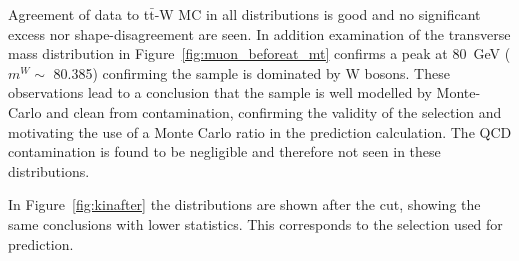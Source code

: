 Agreement of data to t$\bar{\textrm{t}}$-W MC in all distributions is good and no significant excess nor shape-disagreement are seen. In addition examination of the transverse mass distribution in Figure~\ref{fig:muon_beforeat_mt} confirms a peak at 80~GeV ($m^{W} \sim$ 80.385) confirming the sample is dominated by W bosons. These observations lead to a conclusion that the sample is well modelled by Monte-Carlo and clean from contamination, confirming the validity of the selection and motivating the use of a Monte Carlo ratio in the prediction calculation. The QCD contamination is found to be negligible and therefore not seen in these distributions. 

In Figure~\ref{fig:kinafter} the distributions are shown after the \alt cut, showing the same conclusions with lower statistics. This corresponds to the selection used for prediction.





